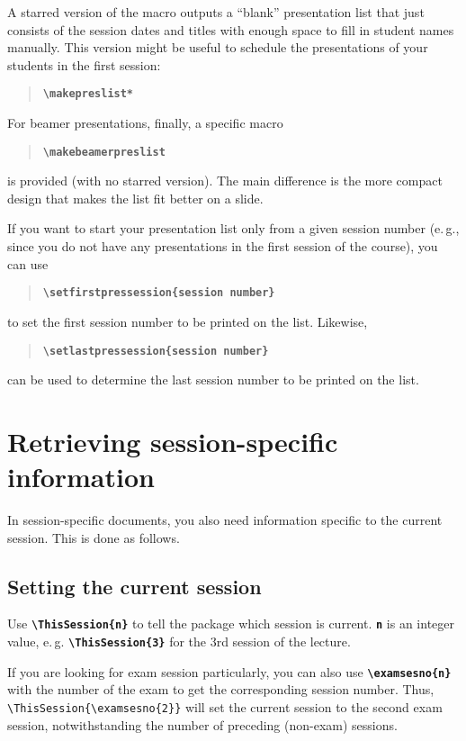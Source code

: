 \documentclass[english]{article}
\newcommand*\jmacro[1]{\textbf{\texttt{#1}}}
\newcommand*\jcsmacro[1]{\jmacro{\textbackslash{#1}}}
\newcommand*\joption[1]{\textbf{\texttt{#1}}}
\newcommand*\jparam[1]{\angus #1\angud}
\begin{document}
A starred version of the macro outputs a ``blank'' presentation list that just consists of
the session dates and titles with enough space to fill in student names manually.
This version might be useful to schedule the presentations of your students in the first
session:

\begin{quote}
\jcsmacro{makepreslist*}
\end{quote}
For beamer presentations, finally, a specific macro

\begin{quote}
\jcsmacro{makebeamerpreslist}
\end{quote}
is provided (with no starred version). The main difference is the more compact design that makes
the list fit better on a slide.

If you want to start your presentation list only from a given session number (e.\,g., since you
do not have any presentations in the first session of the course), you can use

\begin{quote}
\jcsmacro{setfirstpressession\{\jparam{session number}\}}
\end{quote}
to set the first session number to be printed on the list. Likewise, 
\begin{quote}
\jcsmacro{setlastpressession\{\jparam{session number}\}}
\end{quote}
can be used to determine the last session number to be printed on the list.


\section{Retrieving session-specific information\label{sec:session-specific-info}}

In session-specific documents, you also need information specific
to the current session. This is done as follows.


\subsection{Setting the current session}

Use \jcsmacro{ThisSession\{\jparam{n}\}} to tell the package
which session is current. \joption{\jparam{n}} is an integer value, e.\,g.
\jcsmacro{ThisSession\{3\}} for the 3rd session of the lecture.

If you are looking for exam session particularly, you can also use
\jcsmacro{examsesno\{\jparam{n}\}} with the number of the exam to get the
corresponding session number. Thus, \verb|\ThisSession{\examsesno{2}}|
will set the current session to the second exam session, notwithstanding
the number of preceding (non-exam) sessions.
\end{document}
